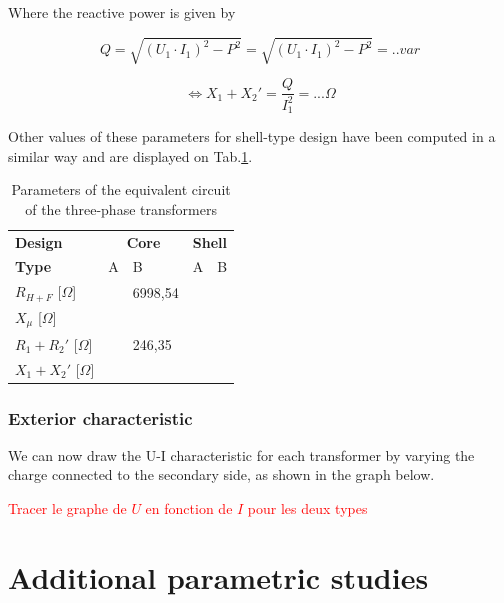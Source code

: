 \documentclass[12pt,a4paper]{report}
\begin{document}
Where the reactive power is given by

\begin{equation}
    Q = \sqrt{(U_1 \cdot I_1)^2-P^2} = \sqrt{(U_1 \cdot I_1)^2-P^2} = .. var
\end{equation}

\begin{equation}
    \iff X_1 + X_2' = \frac{Q}{I_1^2} = ... \Omega
\end{equation}

Other values of these parameters for shell-type design have been computed in a similar way and are displayed on Tab.\ref{tab:equivalent_parameters}.

\begin{table}[h]
    \centering
\begin{tabular}{l|ll|ll}
\textbf{Design}                            & \multicolumn{2}{c|}{\textbf{Core}} & \multicolumn{2}{c}{\textbf{Shell}} \\
\textbf{Type}      &     A & B & A & B\\
$R_{H+F}$ [$\Omega$] & & 6998,54 & & \\
$X_\mu$ [$\Omega$] & & & & \\
$R_1 + R_2'$ [$\Omega$] & & 246,35 & & \\
$X_1 + X_2'$ [$\Omega$] & & & & \\
           

\end{tabular}
    \caption{Parameters of the equivalent circuit of the three-phase transformers}
    \label{tab:equivalent_parameters}
\end{table}

\subsubsection{Exterior characteristic}
We can now draw the U-I characteristic for each transformer by varying the charge connected to the secondary side, as shown in the graph below.

\textcolor{red}{Tracer le graphe de $U$ en fonction de $I$ pour les deux types}

\section{Additional parametric studies}
\end{document}
